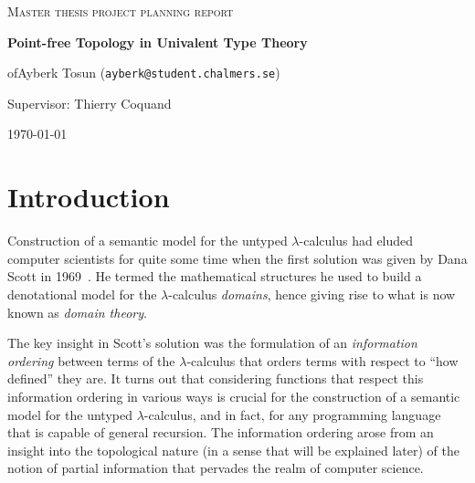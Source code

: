 \documentclass{article}
\begin{document}
\begin{titlepage}

\centering
  
{\scshape\LARGE Master thesis project planning report\\}
  
\vspace{0.5cm}
  
{\huge\bfseries Point-free Topology in Univalent Type Theory\\}
  
\vspace{2cm}

of{\Large Ayberk Tosun (\texttt{ayberk@student.chalmers.se})\\}
  
\vspace{1.0cm}
  
{\large Supervisor: Thierry Coquand\\}

\vspace{1.5cm}

\vfill

\vfill
  
{\large \today\\} 

\end{titlepage}

\section{Introduction}

Construction of a semantic model for the untyped $\lambda$-calculus had eluded computer
scientists for quite some time when the first solution was given by Dana Scott in
1969~\cite{scott:1969}. He termed the mathematical structures he used to build a
denotational model for the $\lambda$-calculus \emph{domains}, hence giving rise to what is now
known as \emph{domain theory}.

The key insight in Scott's solution was the formulation of an \emph{information ordering}
between terms of the $\lambda$-calculus that orders terms with respect to ``how defined'' they
are. It turns out that considering functions that respect this information ordering in
various ways is crucial for the construction of a semantic model for the untyped
$\lambda$-calculus, and in fact, for any programming language that is capable of general
recursion. The information ordering arose from an insight into the topological nature (in
a sense that will be explained later) of the notion of partial information that pervades
the realm of computer science.
\end{document}
